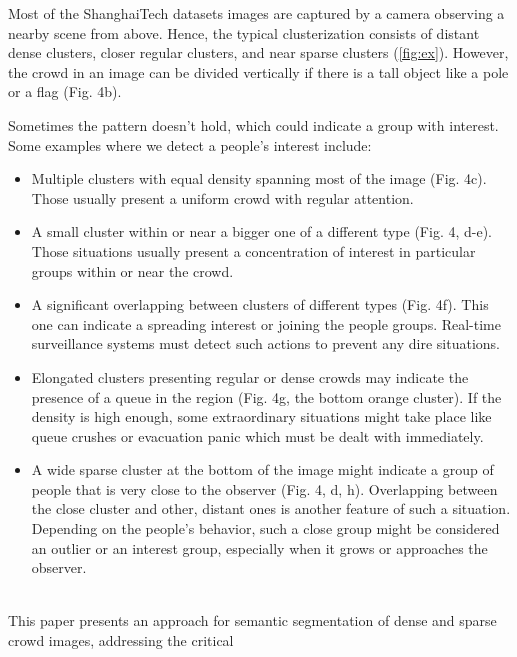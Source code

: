 \documentclass{article}
\begin{document}
\begin{multicols}{2}
 \justifying \par Most of the ShanghaiTech datasets images are captured by a camera observing a nearby scene from above. Hence, the typical clusterization consists of distant dense clusters, closer regular clusters, and near sparse clusters (\ref{fig:ex}). However, the crowd in an image can be divided vertically if there is a tall object like a pole or a flag (Fig. 4b).\columnbreak
\justifying
 \par Sometimes the pattern doesn't hold, which could indicate a group with interest. Some examples where we detect a people's interest include:\\
\normalsize
\begin{itemize}
    \item Multiple clusters with equal density spanning most of the image (Fig. 4c). Those usually present a uniform crowd with regular attention.
    \item A small cluster within or near a bigger one of a different type (Fig. 4, d-e). Those situations usually present a concentration of interest in particular groups within or near the crowd.
    \item A significant overlapping between clusters of different types (Fig. 4f). This one can indicate a spreading interest or joining the people groups. Real-time surveillance systems must detect such actions to prevent any dire situations.
    \item Elongated clusters presenting regular or dense crowds may indicate the presence of a queue in the region (Fig. 4g, the bottom orange cluster). If the density is high enough, some extraordinary situations might take place like queue crushes or evacuation panic which must be dealt with immediately.
    \item A wide sparse cluster at the bottom of the image might indicate a group of people that is very close to the observer (Fig. 4, d, h). Overlapping between the close cluster and other, distant ones is another feature of such a situation. Depending on the people's behavior, such a close group might be considered an outlier or an interest group, especially when it grows or approaches the observer.
\end{itemize}

\large
{}
\\
\small
\justifying This paper presents an approach for semantic segmentation of dense and sparse crowd images, addressing the critical 
\end{multicols}
\end{document}
